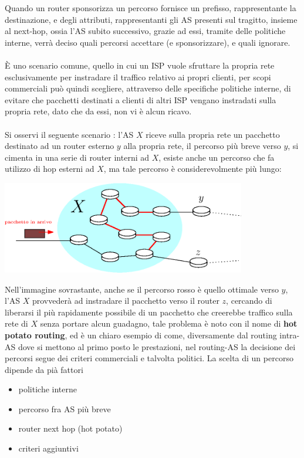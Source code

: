 \documentclass[12pt, letterpaper]{article}
\newcommand{\acc}{\\\hphantom{}\\}
\begin{document}
Quando un router sponsorizza un percorso fornisce un prefisso, rappresentante la destinazione, e degli attributi, 
rappresentanti gli AS presenti sul tragitto, insieme al next-hop, ossia l'AS subito successivo, grazie ad essi, 
tramite delle politiche interne, verrà deciso quali percorsi accettare (e sponsorizzare), e quali ignorare.\acc 
È uno scenario comune, quello in cui un ISP vuole sfruttare la propria rete esclusivamente per instradare il traffico 
relativo ai propri clienti, per scopi commerciali può quindi scegliere, attraverso delle specifiche politiche interne, di 
evitare che pacchetti destinati a clienti di altri ISP vengano instradati sulla propria rete, dato che da essi, non vi 
è alcun ricavo.\acc 
Si osservi il seguente scenario : l'AS $X$ riceve sulla propria rete un pacchetto destinato ad un router esterno $y$ 
alla propria rete, il percorso più breve verso $y$, si cimenta in una serie di router interni ad $X$, esiste anche un 
percorso che fa utilizzo di hop esterni ad $X$, ma tale percorso è considerevolmente più lungo:\begin{center}
    \includegraphics[width=0.8\textwidth ]{images/hotPotato.eps}
\end{center}
Nell'immagine sovrastante, anche se il percorso rosso è quello ottimale verso $y$, l'AS $X$ provvederà ad instradare 
il pacchetto verso il router $z$, cercando di liberarsi il più rapidamente possibile di un pacchetto che 
creerebbe traffico sulla rete di $X$ senza portare alcun guadagno, tale problema è noto con il nome di \textbf{hot 
potato routing}, ed è un chiaro esempio di come, diversamente dal routing intra-AS dove si mettono al primo posto le prestazioni, 
nel routing-AS la decisione dei percorsi segue dei criteri commerciali e talvolta politici. La scelta di un percorso dipende 
da pià fattori\begin{itemize}
    \item politiche interne 
    \item percorso fra AS più breve 
    \item router next hop (hot potato) 
    \item criteri aggiuntivi
\end{itemize}
\end{document}
